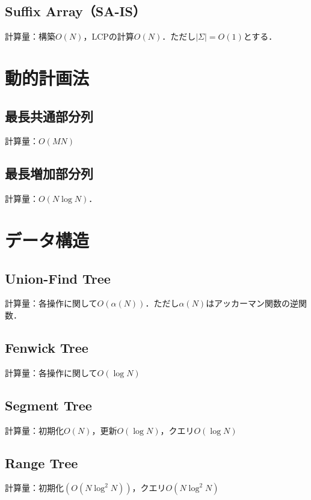 \documentclass[landscape,twocolumn,9pt]{jsarticle}
\begin{document}
\subsection{Suffix Array（SA-IS）}
計算量：構築$O(N)$，LCPの計算$O(N)$．ただし$|\Sigma|=O(1)$とする．


\section{動的計画法}%
\subsection{最長共通部分列}
計算量：$O(MN)$


\subsection{最長増加部分列}
計算量：$O(N\log N)$．


\section{データ構造}%
\subsection{Union-Find Tree}
計算量：各操作に関して$O(\alpha(N))$．ただし$\alpha(N)$はアッカーマン関数の逆関数．


\subsection{Fenwick Tree}
計算量：各操作に関して$O(\log N)$


\subsection{Segment Tree}
計算量：初期化$O(N)$，更新$O(\log N)$，クエリ$O(\log N)$


\subsection{Range Tree}
計算量：初期化$(O(N \log^2 N))$，クエリ$O(N \log^2 N)$

\end{document}
